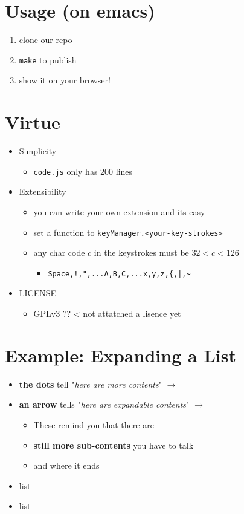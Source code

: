 \section{Usage (on emacs)}
\label{sec-3}

\begin{enumerate}
\item clone \href{https://github.com/guicho271828/another-org-info}{our repo}

\item \texttt{make} to publish

\item show it on your browser!
\end{enumerate}
\section{Virtue}
\label{sec-4}

\begin{itemize}
\item Simplicity
\begin{itemize}
\item \texttt{code.js} only has 200 lines
\end{itemize}
\item Extensibility
\begin{itemize}
\item you can write your own extension and its easy
\item set a function to \texttt{keyManager.<your-key-strokes>}
\item any char code \(c\) in the keystrokes must be \(32 < c < 126\)
\begin{itemize}
\item \texttt{Space,!,",...A,B,C,...x,y,z,\{,|,\textasciitilde{}}
\end{itemize}
\end{itemize}
\item LICENSE
\begin{itemize}
\item GPLv3 ?? < not attatched a lisence yet
\end{itemize}
\end{itemize}
\section{Example: Expanding a List}
\label{sec-5}

\begin{itemize}
\item \textbf{the dots} tell "\emph{here are more contents}" \(\rightarrow\)
\item \textbf{an arrow} tells "\emph{here are expandable contents}" \(\rightarrow\)
\begin{itemize}
\item These remind you that there are
\item \textbf{still more sub-contents} you have to talk
\item and where it ends
\end{itemize}
\item list
\item list
\end{itemize}
